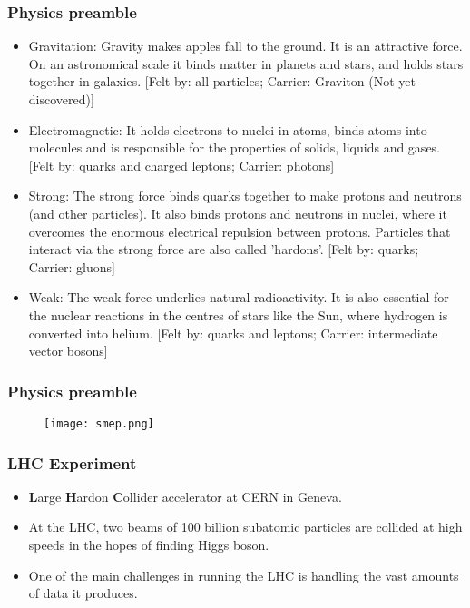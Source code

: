 \documentclass[8pt]{beamer}
\begin{document}
\begin{frame}
\frametitle{Physics preamble}
\begin{itemize}
\item Gravitation: Gravity makes apples fall to the ground. It is an attractive force.
On an astronomical scale it binds matter in planets and stars, and holds stars together
in galaxies.
[Felt by: all particles; Carrier: Graviton (Not yet discovered)]\\[0.5cm]
\item Electromagnetic: It holds electrons to nuclei in atoms, binds atoms into molecules
and is responsible for the properties of solids, liquids and gases.
[Felt by: quarks and charged leptons; Carrier: photons]\\[0.5cm]
\item Strong: The strong force binds quarks together to make protons and neutrons (and
other particles). It also binds protons and neutrons in nuclei, where it overcomes the
enormous electrical repulsion between protons. Particles that interact via the strong
force are also called 'hardons'.
[Felt by: quarks; Carrier: gluons]\\[0.5cm]
\item Weak: The weak force underlies natural radioactivity. It is also essential for the
nuclear reactions in the centres of stars like the Sun, where hydrogen is converted into
helium.
[Felt by: quarks and leptons; Carrier: intermediate vector bosons] 
\end{itemize}
\end{frame}

\begin{frame}
\frametitle{Physics preamble}
\begin{figure}[ht!]
\texttt{[image: smep.png]}
\centering
\end{figure}
\end{frame}

\begin{frame}
\frametitle{LHC Experiment}
\begin{itemize}
\begin{figure}[ht!]
\texttt{[image: detector.png]}
\end{figure}
\item \textbf{L}arge \textbf{H}ardon \textbf{C}ollider accelerator at CERN in Geneva.
\\[0.5cm]
\item At the LHC, two beams of 100 billion subatomic particles are collided at high
speeds in the hopes of finding Higgs boson.\\[0.5cm]
\item One of the main challenges in running the LHC is handling the vast amounts of data
it produces.\\[0.5cm]
\end{itemize}
\end{frame}
\end{document}
